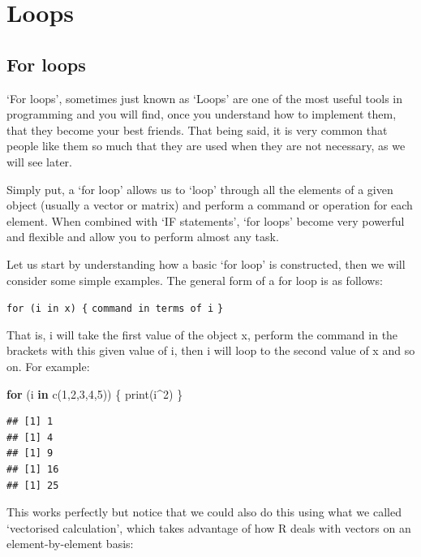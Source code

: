 \documentclass[
]{book}
\newenvironment{Shaded}{\begin{snugshade}}{\end{snugshade}}
\newcommand{\ControlFlowTok}[1]{\textcolor[rgb]{0.13,0.29,0.53}{\textbf{#1}}}
\newcommand{\DecValTok}[1]{\textcolor[rgb]{0.00,0.00,0.81}{#1}}
\newcommand{\FunctionTok}[1]{\textcolor[rgb]{0.00,0.00,0.00}{#1}}
\newcommand{\NormalTok}[1]{#1}
\newcommand{\SpecialCharTok}[1]{\textcolor[rgb]{0.00,0.00,0.00}{#1}}
\theoremstyle{definition}
\theoremstyle{definition}
\theoremstyle{definition}
\theoremstyle{definition}
\theoremstyle{remark}
\begin{document}
\hypertarget{loops}{%
\chapter{Loops}\label{loops}}

\hypertarget{for-loops}{%
\section{For loops}\label{for-loops}}

`For loops', sometimes just known as `Loops' are one of the most useful tools in programming and you will find, once you understand how to implement them, that they become your best friends. That being said, it is very common that people like them so much that they are used when they are not necessary, as we will see later.

Simply put, a `for loop' allows us to `loop' through all the elements of a given object (usually a vector or matrix) and perform a command or operation for each element. When combined with `IF statements', `for loops' become very powerful and flexible and allow you to perform almost any task.

Let us start by understanding how a basic `for loop' is constructed, then we will consider some simple examples. The general form of a for loop is as follows:

\texttt{for\ (i\ in\ x)\ \{}
\texttt{command\ in\ terms\ of\ i}
\texttt{\}}

That is, i will take the first value of the object x, perform the command in the brackets with this given value of i, then i will loop to the second value of x and so on. For example:

\begin{Shaded}
\begin{Highlighting}[]
\ControlFlowTok{for}\NormalTok{ (i }\ControlFlowTok{in} \FunctionTok{c}\NormalTok{(}\DecValTok{1}\NormalTok{,}\DecValTok{2}\NormalTok{,}\DecValTok{3}\NormalTok{,}\DecValTok{4}\NormalTok{,}\DecValTok{5}\NormalTok{)) \{}
  \FunctionTok{print}\NormalTok{(i}\SpecialCharTok{\^{}}\DecValTok{2}\NormalTok{)}
\NormalTok{\}}
\end{Highlighting}
\end{Shaded}

\begin{verbatim}
## [1] 1
## [1] 4
## [1] 9
## [1] 16
## [1] 25
\end{verbatim}

This works perfectly but notice that we could also do this using what we called `vectorised calculation', which takes advantage of how R deals with vectors on an element-by-element basis:
\end{document}
